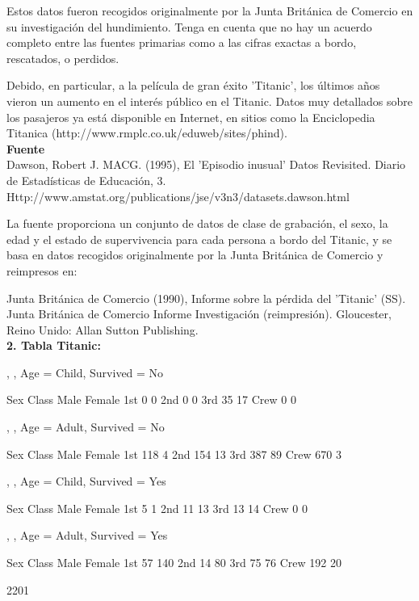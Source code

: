 \documentclass[a4paper,openright,12pt]{report}
\begin{document}
{Estos datos fueron recogidos originalmente por la Junta Británica de Comercio en su investigación del hundimiento. Tenga en cuenta que no hay un acuerdo completo entre las fuentes primarias como a las cifras exactas a bordo, rescatados, o perdidos.

Debido, en particular, a la película de gran éxito 'Titanic', los últimos años vieron un aumento en el interés público en el Titanic. Datos muy detallados sobre los pasajeros ya está disponible en Internet, en sitios como la Enciclopedia Titanica (http://www.rmplc.co.uk/eduweb/sites/phind).\\

\textbf{Fuente}\\

Dawson, Robert J. MACG. (1995), El 'Episodio inusual' Datos Revisited. Diario de Estadísticas de Educación, 3. Http://www.amstat.org/publications/jse/v3n3/datasets.dawson.html

La fuente proporciona un conjunto de datos de clase de grabación, el sexo, la edad y el estado de supervivencia para cada persona a bordo del Titanic, y se basa en datos recogidos originalmente por la Junta Británica de Comercio y reimpresos en:

Junta Británica de Comercio (1990), Informe sobre la pérdida del 'Titanic' (SS). Junta Británica de Comercio Informe Investigación (reimpresión). Gloucester, Reino Unido: Allan Sutton Publishing.\\


\textbf{2. Tabla Titanic:}\\
\begin{Schunk}
\begin{Soutput}
, , Age = Child, Survived = No

      Sex
Class  Male Female
  1st     0      0
  2nd     0      0
  3rd    35     17
  Crew    0      0

, , Age = Adult, Survived = No

      Sex
Class  Male Female
  1st   118      4
  2nd   154     13
  3rd   387     89
  Crew  670      3

, , Age = Child, Survived = Yes

      Sex
Class  Male Female
  1st     5      1
  2nd    11     13
  3rd    13     14
  Crew    0      0

, , Age = Adult, Survived = Yes

      Sex
Class  Male Female
  1st    57    140
  2nd    14     80
  3rd    75     76
  Crew  192     20
\end{Soutput}
\begin{Soutput}
[1] 2201
\end{Soutput}
\end{Schunk}

}
\end{document}
